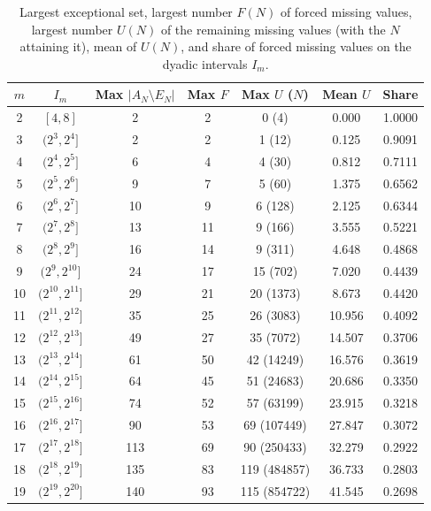 \documentclass[11pt]{amsart}
\theoremstyle{definition}
\theoremstyle{remark}
\begin{document}
\begin{table}[H]
\caption{Largest exceptional set, largest number $F(N)$ of forced missing values, largest number $U(N)$ of the remaining missing values (with the $N$ attaining it), mean of $U(N)$, and share of forced missing values on the dyadic intervals $I_m$.}
\label{tab:forced}
\footnotesize
\setlength{\tabcolsep}{4pt}
\begin{tabularx}{\textwidth}{ccccccc}
\hline
\textbf{$m$} & \textbf{$I_m$} & \textbf{Max $|A_N\setminus E_N|$} & \textbf{Max $F$} & \textbf{Max $U$ ($N$)} & \textbf{Mean $U$} & \textbf{Share} \\
\hline
2 & $[4,8]$ & 2 & 2 & 0 (4) & 0.000 & 1.0000 \\
3 & $(2^{3},2^{4}]$ & 2 & 2 & 1 (12) & 0.125 & 0.9091 \\
4 & $(2^{4},2^{5}]$ & 6 & 4 & 4 (30) & 0.812 & 0.7111 \\
5 & $(2^{5},2^{6}]$ & 9 & 7 & 5 (60) & 1.375 & 0.6562 \\
6 & $(2^{6},2^{7}]$ & 10 & 9 & 6 (128) & 2.125 & 0.6344 \\
7 & $(2^{7},2^{8}]$ & 13 & 11 & 9 (166) & 3.555 & 0.5221 \\
8 & $(2^{8},2^{9}]$ & 16 & 14 & 9 (311) & 4.648 & 0.4868 \\
9 & $(2^{9},2^{10}]$ & 24 & 17 & 15 (702) & 7.020 & 0.4439 \\
10 & $(2^{10},2^{11}]$ & 29 & 21 & 20 (1373) & 8.673 & 0.4420 \\
11 & $(2^{11},2^{12}]$ & 35 & 25 & 26 (3083) & 10.956 & 0.4092 \\
12 & $(2^{12},2^{13}]$ & 49 & 27 & 35 (7072) & 14.507 & 0.3706 \\
13 & $(2^{13},2^{14}]$ & 61 & 50 & 42 (14249) & 16.576 & 0.3619 \\
14 & $(2^{14},2^{15}]$ & 64 & 45 & 51 (24683) & 20.686 & 0.3350 \\
15 & $(2^{15},2^{16}]$ & 74 & 52 & 57 (63199) & 23.915 & 0.3218 \\
16 & $(2^{16},2^{17}]$ & 90 & 53 & 69 (107449) & 27.847 & 0.3072 \\
17 & $(2^{17},2^{18}]$ & 113 & 69 & 90 (250433) & 32.279 & 0.2922 \\
18 & $(2^{18},2^{19}]$ & 135 & 83 & 119 (484857) & 36.733 & 0.2803 \\
19 & $(2^{19},2^{20}]$ & 140 & 93 & 115 (854722) & 41.545 & 0.2698 \\
\hline
\end{tabularx}
\end{table}
\end{document}
